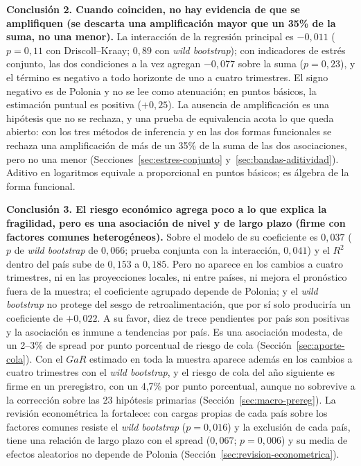 \textbf{Conclusión 2. Cuando coinciden, no hay evidencia de que se amplifiquen (se descarta una amplificación mayor que un 35\% de la suma, no una menor).} La interacción de la regresión principal es $-0{,}011$ ($p=0{,}11$ con Driscoll--Kraay; $0{,}89$ con \textit{wild bootstrap}); con indicadores de estrés conjunto, las dos condiciones a la vez agregan $-0{,}077$ sobre la suma ($p=0{,}23$), y el término es negativo a todo horizonte de uno a cuatro trimestres. El signo negativo es de Polonia y no se lee como atenuación; en puntos básicos, la estimación puntual es positiva ($+0{,}25$). La ausencia de amplificación es una hipótesis que no se rechaza, y una prueba de equivalencia acota lo que queda abierto: con los tres métodos de inferencia y en las dos formas funcionales se rechaza una amplificación de más de un 35\% de la suma de las dos asociaciones, pero no una menor (Secciones~\ref{sec:estres-conjunto} y~\ref{sec:bandas-aditividad}). Aditivo en logaritmos equivale a proporcional en puntos básicos; es álgebra de la forma funcional.

\textbf{Conclusión 3. El riesgo económico agrega poco a lo que explica la fragilidad, pero es una asociación de nivel y de largo plazo (firme con factores comunes heterogéneos).} Sobre el modelo de \citet{Chari2024b} su coeficiente es $0{,}037$ ($p$ de \textit{wild bootstrap} de $0{,}066$; prueba conjunta con la interacción, $0{,}041$) y el $R^2$ dentro del país sube de $0{,}153$ a $0{,}185$. Pero no aparece en los cambios a cuatro trimestres, ni en las proyecciones locales, ni entre países, ni mejora el pronóstico fuera de la muestra; el coeficiente agrupado depende de Polonia; y el \textit{wild bootstrap} no protege del sesgo de retroalimentación, que por sí solo produciría un coeficiente de $+0{,}022$. A su favor, diez de trece pendientes por país son positivas y la asociación es inmune a tendencias por país. Es una asociación modesta, de un 2--3\% de spread por punto porcentual de riesgo de cola (Sección~\ref{sec:aporte-cola}). Con el $GaR$ estimado en toda la muestra aparece además en los cambios a cuatro trimestres con el \textit{wild bootstrap}, y el riesgo de cola del año siguiente es firme en un preregistro, con un 4,7\% por punto porcentual, aunque no sobrevive a la corrección sobre las 23 hipótesis primarias (Sección~\ref{sec:macro-prereg}). La revisión econométrica la fortalece: con cargas propias de cada país sobre los factores comunes resiste el \textit{wild bootstrap} ($p=0{,}016$) y la exclusión de cada país, tiene una relación de largo plazo con el spread ($0{,}067$; $p=0{,}006$) y su media de efectos aleatorios no depende de Polonia (Sección~\ref{sec:revision-econometrica}).


